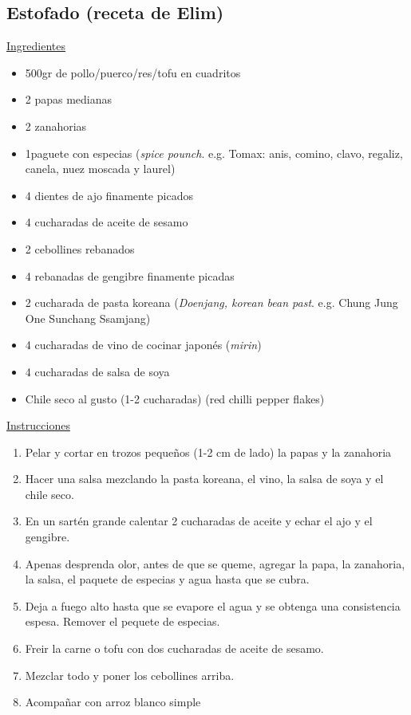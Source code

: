 \subsection{Estofado (receta de Elim)}
\underline{Ingredientes}
\begin{itemize}
\item 500gr de pollo/puerco/res/tofu en cuadritos
\item 2 papas medianas
\item 2 zanahorias
\item 1paguete con especias (\textit{spice pounch}. e.g. Tomax: anis, comino, clavo, regaliz, canela, nuez moscada y laurel)
\item 4 dientes de ajo finamente picados
\item 4 cucharadas de aceite de sesamo
\item 2 cebollines rebanados
\item 4 rebanadas de gengibre finamente picadas
\item 2 cucharada de pasta koreana (\textit{Doenjang, korean bean past}. e.g. Chung Jung One Sunchang Ssamjang)
\item 4 cucharadas de vino de cocinar japon\'es (\textit{mirin})
\item 4 cucharadas de salsa de soya
\item Chile seco al gusto (1-2 cucharadas) (red chilli pepper flakes)
\end{itemize}

\underline{Instrucciones}
\begin{enumerate}
\item Pelar y cortar en trozos peque\~nos (1-2 cm de lado) la papas y la zanahoria
\item Hacer una salsa mezclando la pasta koreana, el vino, la salsa de soya y el chile seco.
\item En un sartén grande calentar 2 cucharadas de aceite y echar el ajo y el gengibre.
\item Apenas desprenda olor, antes de que se queme, agregar la papa, la zanahoria, la salsa, el paquete de especias y agua hasta que se cubra.
\item Deja a fuego alto hasta que se evapore el agua y se obtenga una consistencia espesa. Remover el pequete de especias.
\item Freir la carne o tofu con dos cucharadas de aceite de sesamo.
\item Mezclar todo y poner los cebollines arriba.
\item Acompañar con arroz blanco simple
\end{enumerate}
